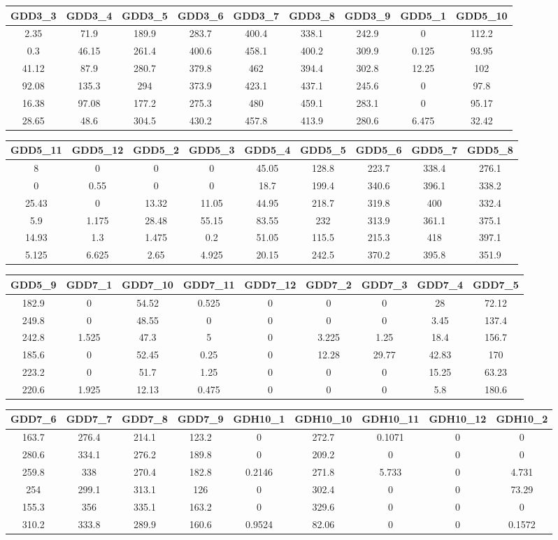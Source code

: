\documentclass[10pt,]{article}
\begin{document}
\begin{longtable}[]{@{}ccccccccc@{}}
\toprule
GDD3\_3 & GDD3\_4 & GDD3\_5 & GDD3\_6 & GDD3\_7 & GDD3\_8 & GDD3\_9 &
GDD5\_1 & GDD5\_10\tabularnewline
\midrule
\endhead
2.35 & 71.9 & 189.9 & 283.7 & 400.4 & 338.1 & 242.9 & 0 &
112.2\tabularnewline
0.3 & 46.15 & 261.4 & 400.6 & 458.1 & 400.2 & 309.9 & 0.125 &
93.95\tabularnewline
41.12 & 87.9 & 280.7 & 379.8 & 462 & 394.4 & 302.8 & 12.25 &
102\tabularnewline
92.08 & 135.3 & 294 & 373.9 & 423.1 & 437.1 & 245.6 & 0 &
97.8\tabularnewline
16.38 & 97.08 & 177.2 & 275.3 & 480 & 459.1 & 283.1 & 0 &
95.17\tabularnewline
28.65 & 48.6 & 304.5 & 430.2 & 457.8 & 413.9 & 280.6 & 6.475 &
32.42\tabularnewline
\bottomrule
\end{longtable}

\begin{longtable}[]{@{}ccccccccc@{}}
\toprule
GDD5\_11 & GDD5\_12 & GDD5\_2 & GDD5\_3 & GDD5\_4 & GDD5\_5 & GDD5\_6 &
GDD5\_7 & GDD5\_8\tabularnewline
\midrule
\endhead
8 & 0 & 0 & 0 & 45.05 & 128.8 & 223.7 & 338.4 & 276.1\tabularnewline
0 & 0.55 & 0 & 0 & 18.7 & 199.4 & 340.6 & 396.1 & 338.2\tabularnewline
25.43 & 0 & 13.32 & 11.05 & 44.95 & 218.7 & 319.8 & 400 &
332.4\tabularnewline
5.9 & 1.175 & 28.48 & 55.15 & 83.55 & 232 & 313.9 & 361.1 &
375.1\tabularnewline
14.93 & 1.3 & 1.475 & 0.2 & 51.05 & 115.5 & 215.3 & 418 &
397.1\tabularnewline
5.125 & 6.625 & 2.65 & 4.925 & 20.15 & 242.5 & 370.2 & 395.8 &
351.9\tabularnewline
\bottomrule
\end{longtable}

\begin{longtable}[]{@{}ccccccccc@{}}
\toprule
GDD5\_9 & GDD7\_1 & GDD7\_10 & GDD7\_11 & GDD7\_12 & GDD7\_2 & GDD7\_3 &
GDD7\_4 & GDD7\_5\tabularnewline
\midrule
\endhead
182.9 & 0 & 54.52 & 0.525 & 0 & 0 & 0 & 28 & 72.12\tabularnewline
249.8 & 0 & 48.55 & 0 & 0 & 0 & 0 & 3.45 & 137.4\tabularnewline
242.8 & 1.525 & 47.3 & 5 & 0 & 3.225 & 1.25 & 18.4 &
156.7\tabularnewline
185.6 & 0 & 52.45 & 0.25 & 0 & 12.28 & 29.77 & 42.83 &
170\tabularnewline
223.2 & 0 & 51.7 & 1.25 & 0 & 0 & 0 & 15.25 & 63.23\tabularnewline
220.6 & 1.925 & 12.13 & 0.475 & 0 & 0 & 0 & 5.8 & 180.6\tabularnewline
\bottomrule
\end{longtable}

\begin{longtable}[]{@{}ccccccccc@{}}
\toprule
GDD7\_6 & GDD7\_7 & GDD7\_8 & GDD7\_9 & GDH10\_1 & GDH10\_10 & GDH10\_11
& GDH10\_12 & GDH10\_2\tabularnewline
\midrule
\endhead
163.7 & 276.4 & 214.1 & 123.2 & 0 & 272.7 & 0.1071 & 0 &
0\tabularnewline
280.6 & 334.1 & 276.2 & 189.8 & 0 & 209.2 & 0 & 0 & 0\tabularnewline
259.8 & 338 & 270.4 & 182.8 & 0.2146 & 271.8 & 5.733 & 0 &
4.731\tabularnewline
254 & 299.1 & 313.1 & 126 & 0 & 302.4 & 0 & 0 & 73.29\tabularnewline
155.3 & 356 & 335.1 & 163.2 & 0 & 329.6 & 0 & 0 & 0\tabularnewline
310.2 & 333.8 & 289.9 & 160.6 & 0.9524 & 82.06 & 0 & 0 &
0.1572\tabularnewline
\bottomrule
\end{longtable}
\end{document}
